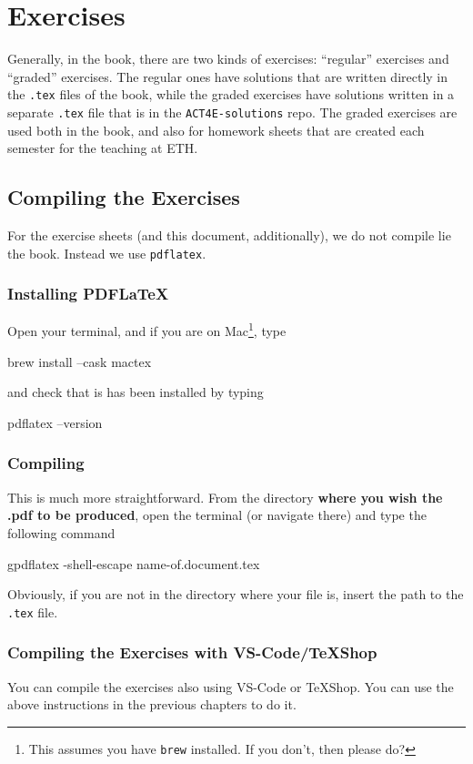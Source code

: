 \documentclass{article}
\begin{document}
\section{Exercises}
Generally, in the book, there are two kinds of exercises: “regular” exercises and “graded” exercises. The regular ones have solutions that are written directly in the \texttt{.tex} files of the book, while the graded exercises have solutions written in a separate \texttt{.tex} file that is in the \texttt{ACT4E-solutions} repo. The graded exercises are used both in the book, and also for homework sheets that are created each semester for the teaching at ETH.

\subsection{Compiling the Exercises}

For the exercise sheets (and this document, additionally), we do not compile lie the book. Instead we use \texttt{pdflatex}. 
\subsubsection{Installing PDFLaTeX}
Open your terminal, and if you are on Mac\footnote{This assumes you have \texttt{brew} installed. If you don't, then please do?}, type 
\begin{bashcode}
    brew install --cask mactex
 \end{bashcode}
 and check that is has been installed by typing 
 \begin{bashcode}
    pdflatex --version
\end{bashcode}
\subsubsection{Compiling}
This is much more straightforward. From the directory \textbf{where you wish the .pdf to be produced}, open the terminal (or navigate there) and type the following command
\begin{bashcode}
    gpdflatex -shell-escape name-of.document.tex
\end{bashcode}
Obviously, if you are not in the directory where your file is, insert the path to the \texttt{.tex} file.

\subsubsection{Compiling the Exercises with VS-Code/TeXShop}
You can compile the exercises also using VS-Code or TeXShop. You can use the above instructions in the previous chapters to do it.
\newpage
\end{document}
